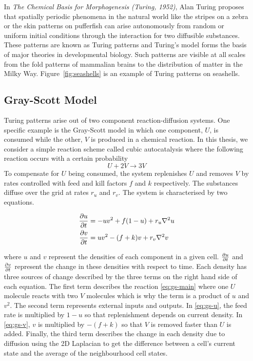 In \textit{The Chemical Basis for Morphogenesis (Turing, 1952)}\cite{turing1990chemical}, Alan Turing proposes that spatially periodic phenomena in the natural world like the stripes on a zebra or the skin patterns on pufferfish can arise autonomously from random or uniform initial conditions through the interaction for two diffusible substances. These patterns are known as Turing patterns and Turing's model forms the basis of major theories in developmental biology. Such patterns are visible at all scales from the fold patterns of mammalian brains\cite{cartwright2002labyrinthine} to the distribution of matter in the Milky Way\cite{smolin1996galactic}. Figure~\ref{fig:seashells} is an example of Turing patterns on seashells.

\subsection{Gray-Scott Model}

Turing patterns arise out of two component reaction-diffusion systems. One specific example is the Gray-Scott model\cite{gray1983autocatalytic} in which one component, $U$, is consumed while the other, $V$ is produced in a chemical reaction. In this thesis, we consider a simple reaction scheme called cubic autocatalysis where the following reaction occurs with a certain probability
\begin{equation}\label{eq:gs-main}
  U + 2V \rightarrow 3V
\end{equation}
To compensate for $U$ being consumed, the system replenishes $U$ and removes $V$ by rates controlled with feed and kill factors $f$ and $k$ respectively. The substances diffuse over the grid at rates $r_u$ and $r_v$. The system is characterised by two equations.
\begin{definition} \label{def:reaction-diffusion}
\begin{align} 
  \label{eq:gs-u} \pdv{u}{t} &= -uv^2 + f(1-u) + r_u \nabla^2 u\\
  \label{eq:gs-v} \pdv{v}{t} &= uv^2 - (f+k)v + r_v \nabla^2 v
\end{align}
\end{definition}
where $u$ and $v$ represent the densities of each component in a given cell. $\pdv{u}{t}$ and $\pdv{v}{t}$ represent the change in these densities with respect to time. Each density has three sources of change described by the three terms on the right hand side of each equation. The first term describes the reaction \ref{eq:gs-main} where one $U$ molecule reacts with two $V$ molecules which is why the term is a product of $u$ and $v^2$. The second term represents external inputs and outputs. In \ref{eq:gs-u}, the feed rate is multiplied by $1-u$ so that replenishment depends on current density. In \ref{eq:gs-v}, $v$ is multiplied by $-(f+k)$ so that $V$ is removed faster than $U$ is added. Finally, the third term describes the change in each density due to diffusion using the 2D Laplacian to get the difference between a cell's current state and the average of the neighbourhood cell states.\\

